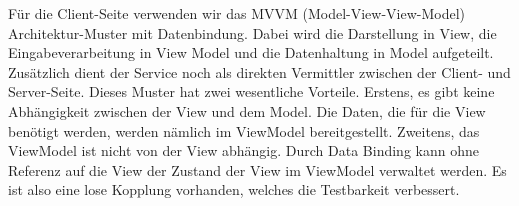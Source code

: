 Für die Client-Seite verwenden wir das MVVM (Model-View-View-Model) Architektur-Muster mit Datenbindung. 
Dabei wird die Darstellung in View, die Eingabeverarbeitung in View Model und die Datenhaltung in Model aufgeteilt. Zusätzlich dient der Service noch als direkten Vermittler zwischen der Client- und Server-Seite.
Dieses Muster hat zwei wesentliche Vorteile.
Erstens, es gibt keine Abhängigkeit zwischen der View und dem Model. Die Daten, die für die View benötigt werden, werden nämlich im ViewModel bereitgestellt.
Zweitens, das ViewModel ist nicht von der View abhängig. Durch Data Binding kann ohne Referenz auf die View der Zustand der View im ViewModel verwaltet werden. 
Es ist also eine lose Kopplung vorhanden, welches die Testbarkeit verbessert.
